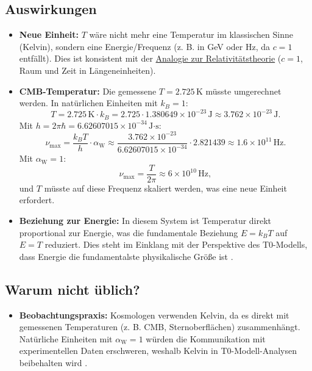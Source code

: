 \documentclass[12pt,a4paper]{article}
\newcommand{\alphaW}{\alpha_{\text{W}}}
\begin{document}
	\subsection{Auswirkungen}
\begin{tcolorbox}[colback=blue!5!white,colframe=blue!75!black,title={Auswirkungen von $\alphaW = 1$}]	

		\begin{itemize}
			\item \textbf{Neue Einheit:} \(T\) wäre nicht mehr eine Temperatur im klassischen Sinne (Kelvin), sondern eine Energie/Frequenz (z. B. in GeV oder Hz, da \(c = 1\) entfällt). Dies ist konsistent mit der \href{https://github.com/jpascher/T0-Time-Mass-Duality/tree/main/2/pdf/Deutsch/Eine neue Perspektive auf Zeit und Raum Johann Paschers revolutionäre Ideen_de.pdf}{Analogie zur Relativitätstheorie} (\(c = 1\), Raum und Zeit in Längeneinheiten).
			
			\item \textbf{CMB-Temperatur:} Die gemessene \(T = 2.725 \, \text{K}\) müsste umgerechnet werden. In natürlichen Einheiten mit \(k_B = 1\):
			\[
			T = 2.725 \, \text{K} \cdot k_B = 2.725 \cdot 1.380649 \times 10^{-23} \, \text{J} \approx 3.762 \times 10^{-23} \, \text{J}.
			\]
			Mit \(h = 2\pi \hbar = 6.62607015 \times 10^{-34} \, \text{J·s}\):
			\[
			\nu_{\text{max}} = \frac{k_B T}{h} \cdot \alphaW \approx \frac{3.762 \times 10^{-23}}{6.62607015 \times 10^{-34}} \cdot 2.821439 \approx 1.6 \times 10^{11} \, \text{Hz}.
			\]
			Mit \(\alphaW = 1\):
			\[
			\nu_{\text{max}} = \frac{T}{2\pi} \approx 6 \times 10^{10} \, \text{Hz},
			\]
			und \(T\) müsste auf diese Frequenz skaliert werden, was eine neue Einheit erfordert.
			
			\item \textbf{Beziehung zur Energie:} In diesem System ist Temperatur direkt proportional zur Energie, was die fundamentale Beziehung \(E = k_B T\) auf \(E = T\) reduziert. Dies steht im Einklang mit der Perspektive des T0-Modells, dass Energie die fundamentalste physikalische Größe ist \cite{pascher_alpha_2025}.
		\end{itemize}
	\end{tcolorbox}
	
	\subsection{Warum nicht üblich?}
	
	\begin{itemize}
		\item \textbf{Beobachtungspraxis:} Kosmologen verwenden Kelvin, da es direkt mit gemessenen Temperaturen (z. B. CMB, Sternoberflächen) zusammenhängt. Natürliche Einheiten mit \(\alphaW = 1\) würden die Kommunikation mit experimentellen Daten erschweren, weshalb Kelvin in T0-Modell-Analysen beibehalten wird \cite{pascher_messdifferenzen_2025}.
		

	\end{itemize}
	
\end{document}
